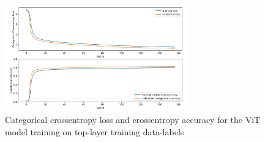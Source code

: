 \begin{figure}[H]
    \centering
    \includegraphics[width=0.7\textwidth]{Figures/best_task_1_model_loss.png}
    \caption{Categorical crossentropy loss and crossentropy accuracy for the ViT model training on top-layer training data-labels}
    \label{fig:top_best_loss}
\end{figure}

